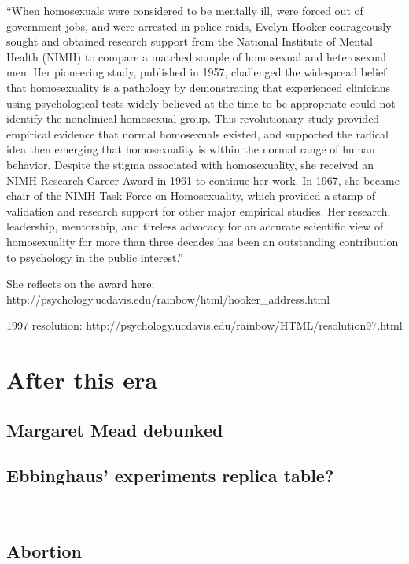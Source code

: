 \begin{refsection}
``When homosexuals were considered to be mentally ill, were forced out of government jobs, and were arrested in police raids, Evelyn Hooker courageously sought and obtained research support from the National Institute of Mental Health (NIMH) to compare a matched sample of homosexual and heterosexual men. Her pioneering study, published in 1957, challenged the widespread belief that homosexuality is a pathology by demonstrating that experienced clinicians using psychological tests widely believed at the time to be appropriate could not identify the nonclinical homosexual group. This revolutionary study provided empirical evidence that normal homosexuals existed, and supported the radical idea then emerging that homosexuality is within the normal range of human behavior. Despite the stigma associated with homosexuality, she received an NIMH Research Career Award in 1961 to continue her work. In 1967, she became chair of the NIMH Task Force on Homosexuality, which provided a stamp of validation and research support for other major empirical studies. Her research, leadership, mentorship, and tireless advocacy for an accurate scientific view of homosexuality for more than three decades has been an outstanding contribution to psychology in the public interest.''

She reflects on the award here: http:\slash \slash psychology.ucdavis.edu\slash rainbow\slash html\slash hooker\_address.html 

1997 resolution: http:\slash \slash psychology.ucdavis.edu\slash rainbow\slash HTML\slash resolution97.html

\section{After this era}
\label{afterthisera}

\subsection{Margaret Mead debunked}
\label{margaretmeaddebunked}

\subsection{Ebbinghaus' experiments replica table?}
\label{ebbinghausexperimentsreplicatable}

~\citep{Murre:2015ix}

\subsection{Abortion}
\label{abortion}


\end{refsection}
